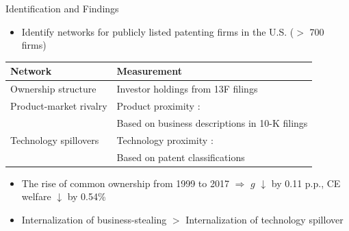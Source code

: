 \documentclass[
  10pt,
  aspectratio=169,   %
]{beamer}
\theoremstyle{plain}
\begin{document}
\begin{frame}{Identification and Findings}
  \begin{itemize}
    \item Identify networks for publicly listed patenting firms in the U.S. ($>$ 700 firms)
  \end{itemize}
  \begin{center}
    \begin{tabular}{l p{8.5cm}}
      \toprule
      Network                & Measurement                                              \\
      \midrule
      Ownership structure    & Investor holdings from 13F filings \citep{Backus2021-yt} \\
      \addlinespace
      Product-market rivalry & Product proximity \citep{Hoberg2016-jm}:                 \\
                             & Based on business descriptions in 10-K filings           \\
      \addlinespace
      Technology spillovers  & Technology proximity \citep{Jaffe1986-yz,Bloom2013-pn}:  \\
                             & Based on patent classifications                          \\
      \bottomrule
    \end{tabular}
  \end{center}
  \medskip{}\pause
  \begin{itemize}
    \item The rise of common ownership from 1999 to 2017 $\Longrightarrow$ $g$ $\downarrow$ by 0.11 p.p., CE welfare $\downarrow$ by 0.54\%
    \medskip{}
    \item Internalization of business-stealing $>$ Internalization of technology spillover
  \end{itemize}
\end{frame}
\end{document}
